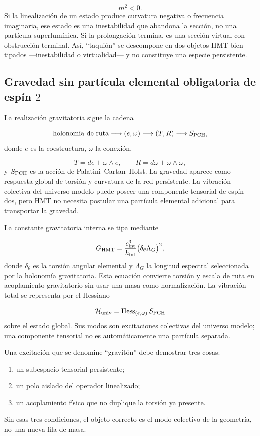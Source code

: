 \[
 m^2<0.
\]
Si la linealización de un estado produce curvatura negativa o frecuencia imaginaria, ese estado es una inestabilidad que abandona la sección, no una partícula superlumínica. Si la prolongación termina, es una sección virtual con obstrucción terminal. Así, “taquión” se descompone en dos objetos HMT bien tipados ---inestabilidad o virtualidad--- y no constituye una especie persistente.

\subsection{Gravedad sin partícula elemental obligatoria de espín \(2\)}
La realización gravitatoria sigue la cadena

\[
 \text{holonomía de ruta}
 \longrightarrow(e,\omega)
 \longrightarrow(T,R)
 \longrightarrow
 S_{\rm PCH},
\]
donde \(e\) es la coestructura, \(\omega\) la conexión,

\[
 T=de+\omega\wedge e,\qquad
 R=d\omega+\omega\wedge\omega,
\]
y \(S_{\rm PCH}\) es la acción de Palatini--Cartan--Holst. La gravedad aparece como respuesta global de torsión y curvatura de la red persistente. La vibración colectiva del universo modelo puede poseer una componente tensorial de espín dos, pero HMT no necesita postular una partícula elemental adicional para transportar la gravedad.

La constante gravitatoria interna se tipa mediante

\[
 G_{\rm HMT}
 =\frac{c_{\rm int}^3}{\hbar_{\rm int}}
 \bigl(\delta_\theta\Lambda_G\bigr)^2,
\]
donde \(\delta_\theta\) es la torsión angular elemental y \(\Lambda_G\) la longitud espectral seleccionada por la holonomía gravitatoria. Esta ecuación convierte torsión y escala de ruta en acoplamiento gravitatorio sin usar una masa como normalización. La vibración total se representa por el Hessiano

\[
 \mathcal H_{\rm univ}
 =\operatorname{Hess}_{(e,\omega)}S_{\rm PCH}
\]
sobre el estado global. Sus modos son excitaciones colectivas del universo modelo; una componente tensorial no es automáticamente una partícula separada.

Una excitación que se denomine “gravitón” debe demostrar tres cosas:

\begin{enumerate}
\item un subespacio tensorial persistente;
\item un polo aislado del operador linealizado;
\item un acoplamiento físico que no duplique la torsión ya presente.
\end{enumerate}
Sin esas tres condiciones, el objeto correcto es el modo colectivo de la geometría, no una nueva fila de masa.


